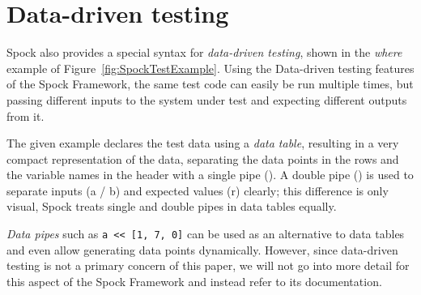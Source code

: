 \section{Data-driven testing}
Spock also provides a special syntax for \textit{data-driven testing},
shown in the \textit{where} example of Figure~\ref{fig:SpockTestExample}.
Using the Data-driven testing features of the Spock Framework,
the same test code can easily be run multiple times,
but passing different inputs to the system under test
and expecting different outputs from it.
\autocite[Chapter: Data Driven Testing]{SpockFrameworkDoc}

The given example declares the test data using a \textit{data table},
resulting in a very compact representation of the data,
separating the data points in the rows
and the variable names in the header
with a single pipe (\code{|}).
A double pipe (\code{||}) is used to separate
inputs (a / b) and expected values (r) clearly;
this difference is only visual,
Spock treats single and double pipes in data tables equally.
\autocite[Chapter: Data Driven Testing - Syntactic Variations]{SpockFrameworkDoc}

\textit{Data pipes} such as \texttt{a << [1, 7, 0]}
can be used as an alternative to data tables and even
allow generating data points dynamically.
However, since data-driven testing is not a primary concern of this paper,
we will not go into more detail for this aspect of the Spock Framework
and instead refer to its documentation.
\autocite{SpockFrameworkDoc}
